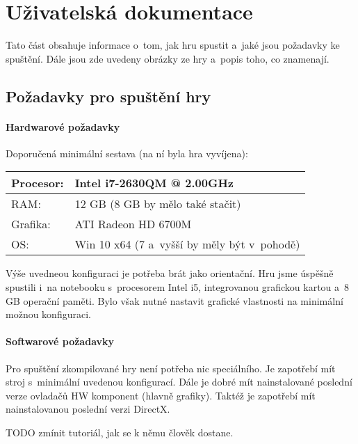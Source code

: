 
\chapter{Uživatelská dokumentace}

Tato část obsahuje informace o~tom, jak hru spustit a~jaké jsou požadavky ke spuštění. Dále jsou zde uvedeny obrázky ze hry a~popis toho, co znamenají. 

\section{Požadavky pro spuštění hry}
\subsubsection{Hardwarové požadavky}

Doporučená minimální sestava (na ní byla hra vyvíjena): 

\begin{center}
	\begin{tabular} { | l | l |}
		\hline
		Procesor: 	&	Intel i7-2630QM @ 2.00GHz \\	\hline
		RAM:		&	12 GB	(8 GB by mělo také stačit) \\	\hline
		Grafika:	&	ATI Radeon HD 6700M \\	\hline
		OS:			&	Win 10 x64	(7 a~vyšší by měly být v~pohodě) \\
		\hline
	\end{tabular}
\end{center}

Výše uvedneou konfiguraci je potřeba brát jako orientační. Hru jsme úspěšně spustili i~na notebooku s~procesorem Intel i5, integrovanou grafickou kartou a~8 GB operační paměti. Bylo však nutné nastavit grafické vlastnosti na minimální možnou konfiguraci. 

\subsubsection{Softwarové požadavky}

Pro spuštění zkompilované hry není potřeba nic speciálního. Je zapotřebí mít stroj s~minimální uvedenou konfigurací. Dále je dobré mít nainstalované poslední verze ovladačů HW komponent (hlavně grafiky).
Taktéž je zapotřebí mít nainstalovanou poslední verzi DirectX. 



TODO zmínit tutoriál, jak se k němu člověk dostane.

%
%
%
%
%
%
%
%
%
%

